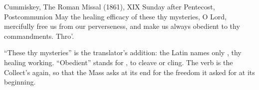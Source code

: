 \begin{englishwitness}{Cummiskey, The Roman Missal (1861), XIX Sunday after Pentecost, Postcommunion}
May the healing efficacy of these thy mysteries, O Lord, mercifully free us from
our perverseness, and make us always obedient to thy commandments. Thro'.
\end{englishwitness}

\noindent ``These thy mysteries'' is the translator's addition: the Latin names
only , thy healing working. ``Obedient'' stands
for , to cleave or cling. The verb  is the
Collect's  again, so that the Mass asks at its end for the
freedom it asked for at its beginning.
